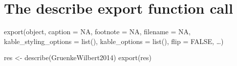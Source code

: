 \documentclass[
  letterpaper,
  DIV=11,
  numbers=noendperiod]{scrreprt}
\newenvironment{Shaded}{\begin{snugshade}}{\end{snugshade}}
\newcommand{\FunctionTok}[1]{\textcolor[rgb]{0.28,0.35,0.67}{#1}}
\newcommand{\NormalTok}[1]{\textcolor[rgb]{0.00,0.23,0.31}{#1}}
\newcommand{\OtherTok}[1]{\textcolor[rgb]{0.00,0.23,0.31}{#1}}
\begin{document}
\begin{tcolorbox}[enhanced jigsaw, breakable, rightrule=.15mm, bottomrule=.15mm, arc=.35mm, colback=white, colframe=quarto-callout-tip-color-frame, opacityback=0, leftrule=.75mm, toprule=.15mm, left=2mm]
\begin{minipage}[t]{5.5mm}
\textcolor{quarto-callout-tip-color}{\faLightbulb}
\end{minipage}%
\begin{minipage}[t]{\textwidth - 5.5mm}


\hypertarget{the-describe-export-function-call}{%
\chapter{The describe export function
call}\label{the-describe-export-function-call}}

export(object, caption = NA, footnote = NA, filename = NA,
kable\_styling\_options = list(), kable\_options = list(), flip = FALSE,
\ldots)

\end{minipage}%
\end{tcolorbox}

\begin{Shaded}
\begin{Highlighting}[]
\NormalTok{res }\OtherTok{\textless{}{-}} \FunctionTok{describe}\NormalTok{(GruenkeWilbert2014)}
\FunctionTok{export}\NormalTok{(res)}
\end{Highlighting}
\end{Shaded}
\end{document}
